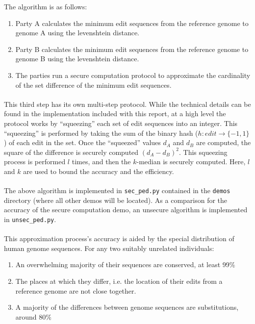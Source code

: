 The algorithm is as follows:

\begin{enumerate}
\item Party A calculates the minimum edit sequences from the reference genome to genome A using the levenshtein distance.
\item Party B calculates the minimum edit sequences from the reference genome to genome B using the levenshtein distance.
\item The parties run a secure computation protocol to approximate the cardinality of the set difference of the minimum edit sequences.
\end{enumerate}

\paragraph{}
This third step has its own multi-step protocol. While the technical details can be found in the implementation included with this report, at a high level the protocol works by ``squeezing'' each set of edit sequences into an integer. This ``squeezing'' is performed by taking the sum of the binary hash ($h : edit \rightarrow \{-1, 1\}$) of each edit in the set. Once the ``squeezed'' values $d_A$ and $d_B$ are computed, the square of the difference is securely computed $(d_A - d_B)^2$. This squeezing process is performed $l$ times, and then the $k$-median is securely computed. Here, $l$ and $k$ are used to bound the accuracy and the efficiency.

\paragraph{}
The above algorithm is implemented in \texttt{sec\_ped.py} contained in the \texttt{demos} directory (where all other demos will be located). As a comparison for the accuracy of the secure computation demo, an unsecure algorithm is implemented in \texttt{unsec\_ped.py}.

\paragraph{}
This approximation process's accuracy is aided by the special distribution of human genome sequences.\cite{naturegene} For any two suitably unrelated individuals:

\begin{enumerate}
\item An overwhelming majority of their sequences are conserved, at least 99\%
\item The places at which they differ, i.e. the location of their edits from a reference genome are not close together.
\item A majority of the differences between genome sequences are substitutions, around 80\%
\end{enumerate}

